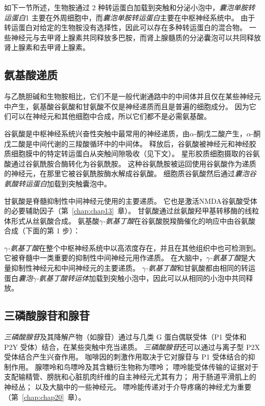 如下一节所述，生物胺通过 2 种转运蛋白加载到突触和分泌小泡中，\textit{囊泡单胺转运蛋白}1 主要在外周细胞中，而\textit{囊泡单胺转运蛋白}主要在中枢神经系统中。
由于转运蛋白对给定的生物胺没有选择性，因此可以存在多种转运蛋白的混合物。
一些神经元与去甲肾上腺素共同释放多巴胺，而肾上腺髓质的分泌囊泡可以共同释放肾上腺素和去甲肾上腺素。



\subsection{氨基酸递质}

与乙酰胆碱和生物胺相比，它们不是一般代谢通路中的中间体并且仅在某些神经元中产生，氨基酸谷氨酸和甘氨酸不仅是神经递质而且是普遍的细胞成分。
因为它们可以在神经元和其他细胞中合成，所以它们都不是必需氨基酸。


谷氨酸是中枢神经系统兴奋性突触中最常用的神经递质，由$\alpha$-酮戊二酸产生，$\alpha$-酮戊二酸是中间代谢的三羧酸循环中的中间体。
释放后，谷氨酸被神经元和神经胶质细胞膜中的特定转运蛋白从突触间隙吸收（见下文）。
星形胶质细胞摄取的谷氨酸通过谷氨酰胺合酶转化为谷氨酰胺。
这种谷氨酰胺被运回使用谷氨酸作为递质的神经元，在那里它被谷氨酰胺酶水解成谷氨酸。
细胞质谷氨酸然后通过\textit{囊泡谷氨酸转运蛋白}加载到突触囊泡中。


甘氨酸是脊髓抑制性中间神经元使用的主要递质。
它也是激活NMDA谷氨酸受体的必要辅助因子（第~\ref{chap:chap13}~章）。
甘氨酸通过丝氨酸羟甲基转移酶的线粒体形式从丝氨酸合成。
氨基酸\textit{$\gamma$-氨基丁酸}在谷氨酸脱羧酶催化的响应中由谷氨酸合成（下面的第 1 步）：


\textit{$\gamma$-氨基丁酸}在整个中枢神经系统中以高浓度存在，并且在其他组织中也可检测到。
它被脊髓中一类重要的抑制性中间神经元用作递质。
在大脑中，\textit{$\gamma$-氨基丁酸}是大量抑制性神经元和中间神经元的主要递质。
\textit{$\gamma$-氨基丁酸}和甘氨酸都由相同的转运蛋白\textit{囊泡$\gamma$-氨基丁酸转运体}加载到突触小泡中，因此可以从相同的小泡中共同释放。



\subsection{三磷酸腺苷和腺苷}

\textit{三磷酸腺苷}及其降解产物（如腺苷）通过与几类 G 蛋白偶联受体（P1 受体和 P2Y 受体）结合，在某些突触中充当递质。
\textit{三磷酸腺苷}还可以通过与离子型 P2X 受体结合产生兴奋作用。
咖啡因的刺激作用取决于它对腺苷与 P1 受体结合的抑制作用。
腺嘌呤和鸟嘌呤及其含糖衍生物称为嘌呤；
嘌呤能受体传输的证据对于支配输精管、膀胱和心脏肌肉纤维的自主神经元尤其有力；
用于肠道平滑肌上的神经丛；
以及大脑中的一些神经元。
嘌呤能传递对于介导疼痛的神经尤为重要（第~\ref{chap:chap20}~章）。



